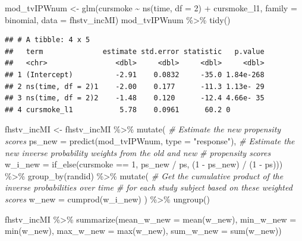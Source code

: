 \documentclass[
]{book}
\newenvironment{Shaded}{\begin{snugshade}}{\end{snugshade}}
\newcommand{\AttributeTok}[1]{\textcolor[rgb]{0.77,0.63,0.00}{#1}}
\newcommand{\CommentTok}[1]{\textcolor[rgb]{0.56,0.35,0.01}{\textit{#1}}}
\newcommand{\DecValTok}[1]{\textcolor[rgb]{0.00,0.00,0.81}{#1}}
\newcommand{\FunctionTok}[1]{\textcolor[rgb]{0.00,0.00,0.00}{#1}}
\newcommand{\NormalTok}[1]{#1}
\newcommand{\OtherTok}[1]{\textcolor[rgb]{0.56,0.35,0.01}{#1}}
\newcommand{\SpecialCharTok}[1]{\textcolor[rgb]{0.00,0.00,0.00}{#1}}
\newcommand{\StringTok}[1]{\textcolor[rgb]{0.31,0.60,0.02}{#1}}
\begin{document}
\begin{Shaded}
\begin{Highlighting}[]
\NormalTok{mod\_tvIPWnum }\OtherTok{\textless{}{-}} \FunctionTok{glm}\NormalTok{(cursmoke }\SpecialCharTok{\textasciitilde{}} \FunctionTok{ns}\NormalTok{(time, }\AttributeTok{df =} \DecValTok{2}\NormalTok{) }\SpecialCharTok{+}\NormalTok{ cursmoke\_l1, }
                    \AttributeTok{family =}\NormalTok{ binomial, }\AttributeTok{data =}\NormalTok{ fhstv\_incMI)}
\NormalTok{mod\_tvIPWnum }\SpecialCharTok{\%\textgreater{}\%}
  \FunctionTok{tidy}\NormalTok{()}
\end{Highlighting}
\end{Shaded}

\begin{verbatim}
## # A tibble: 4 x 5
##   term              estimate std.error statistic   p.value
##   <chr>                <dbl>     <dbl>     <dbl>     <dbl>
## 1 (Intercept)          -2.91    0.0832     -35.0 1.84e-268
## 2 ns(time, df = 2)1    -2.00    0.177      -11.3 1.13e- 29
## 3 ns(time, df = 2)2    -1.48    0.120      -12.4 4.66e- 35
## 4 cursmoke_l1           5.78    0.0961      60.2 0
\end{verbatim}

\begin{Shaded}
\begin{Highlighting}[]
\NormalTok{fhstv\_incMI }\OtherTok{\textless{}{-}}\NormalTok{ fhstv\_incMI }\SpecialCharTok{\%\textgreater{}\%}
  \FunctionTok{mutate}\NormalTok{(}
    \CommentTok{\# Estimate the new propensity scores}
    \AttributeTok{ps\_new =} \FunctionTok{predict}\NormalTok{(mod\_tvIPWnum, }\AttributeTok{type =} \StringTok{"response"}\NormalTok{), }
    \CommentTok{\# Estimate the new inverse probability weights from the old and new }
    \CommentTok{\# propensity scores}
    \AttributeTok{w\_i\_new =} \FunctionTok{if\_else}\NormalTok{(cursmoke }\SpecialCharTok{==} \DecValTok{1}\NormalTok{, ps\_new }\SpecialCharTok{/}\NormalTok{ ps, (}\DecValTok{1} \SpecialCharTok{{-}}\NormalTok{ ps\_new) }\SpecialCharTok{/}\NormalTok{ (}\DecValTok{1} \SpecialCharTok{{-}}\NormalTok{ ps))) }\SpecialCharTok{\%\textgreater{}\%} 
  \FunctionTok{group\_by}\NormalTok{(randid) }\SpecialCharTok{\%\textgreater{}\%}
  \FunctionTok{mutate}\NormalTok{(}
    \CommentTok{\# Get the cumulative product of the inverse probabilities over time}
    \CommentTok{\# for each study subject based on these weighted scores}
    \AttributeTok{w\_new =} \FunctionTok{cumprod}\NormalTok{(w\_i\_new)}
\NormalTok{  ) }\SpecialCharTok{\%\textgreater{}\%} 
  \FunctionTok{ungroup}\NormalTok{()}

\NormalTok{fhstv\_incMI }\SpecialCharTok{\%\textgreater{}\%}
  \FunctionTok{summarize}\NormalTok{(}\AttributeTok{mean\_w\_new =} \FunctionTok{mean}\NormalTok{(w\_new),}
            \AttributeTok{min\_w\_new =} \FunctionTok{min}\NormalTok{(w\_new),}
            \AttributeTok{max\_w\_new =} \FunctionTok{max}\NormalTok{(w\_new),}
            \AttributeTok{sum\_w\_new =} \FunctionTok{sum}\NormalTok{(w\_new))}
\end{Highlighting}
\end{Shaded}
\end{document}
